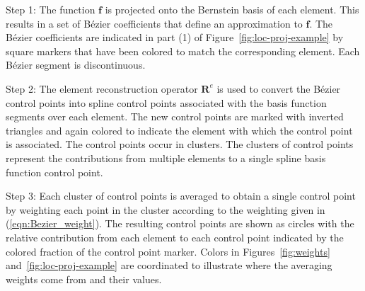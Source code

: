 \documentclass{article}
\newcommand{\Bezier}{{B\'{e}zier} }
\begin{document}
\begin{description}

\item{Step 1:} The function $\mathbf{f}$ is projected onto the Bernstein basis of each element. This results in a set of
  \Bezier coefficients that define an approximation to $\mathbf{f}$.
  The \Bezier coefficients are indicated in part (1) of Figure~\ref{fig:loc-proj-example} by 
  square markers that have been colored to match the corresponding
  element. Each \Bezier segment is discontinuous.

\item{Step 2:} The element reconstruction operator $\mathbf{R}^e$ is used to convert the
  \Bezier control points into spline control points associated with the
  basis function segments over each element.
  The new control points are marked with inverted triangles and
  again colored to indicate the element with which the control point is
  associated. The control points occur in clusters.
  The clusters of control points represent the contributions from
  multiple elements to a single spline basis function control point.

\item{Step 3:} Each cluster of control points is averaged to obtain a
  single control point by weighting each point in the cluster according
  to the weighting given in (\ref{eqn:Bezier_weight}). The resulting control
  points are shown as circles with the relative contribution from each
  element to each control point indicated by the colored fraction of the
  control point marker. Colors in Figures~\ref{fig:weights} and~\ref{fig:loc-proj-example} are coordinated
  to illustrate where the averaging weights come from and their values.
\end{description}
\end{document}
